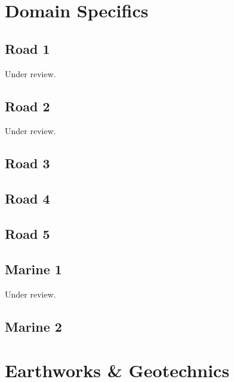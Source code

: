 \documentclass{scrartcl}
\begin{document}
\section{Domain Specifics}
\label{sec:domain_specifics}

\subsection{Road 1}  %
\label{sec:road_1}
Under review.%
\clearpage

\subsection{Road 2} %
\label{sec:road_2}
Under review.%
\clearpage

\subsection{Road 3} %
\label{sec:road_3}
\clearpage

\subsection{Road 4} %
\label{sec:road_4}
\clearpage

\subsection{Road 5} %
\label{sec:road_5}
\clearpage

\subsection{Marine 1} %
\label{sec:marine_1}
Under review.%
\clearpage

\subsection{Marine 2} %
\label{sec:marine_2}
\clearpage

\section{Earthworks \& Geotechnics}
\label{sec:earthworks}
\end{document}
